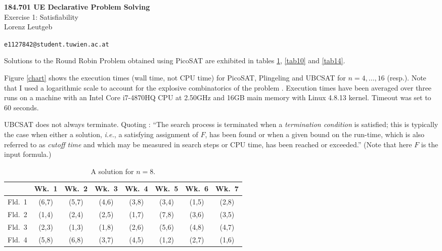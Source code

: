 \documentclass[a4paper]{article}
\begin{document}
\begin{center}
	\textbf{\Large{184.701 UE Declarative Problem Solving}}\\[3mm]
	
	\large{Exercise 1: Satisfiability}\\[7mm]

	Lorenz Leutgeb
	
	\texttt{e1127842@student.tuwien.ac.at}
\end{center}

Solutions to the Round Robin Problem \cite{DBLP:conf/aaai/BejarM00} obtained using PicoSAT are exhibited in tables \ref{tab8}, \ref{tab10} and \ref{tab14}.

Figure \ref{chart} shows the execution times (wall time, not CPU time) for PicoSAT, Plingeling and UBCSAT for $n = 4, \ldots, 16$ (resp.). Note that I used a logarithmic scale to account for the explosive combinatorics of the problem \cite{Mcaloon97sportsleague}. Execution times have been averaged over three runs on a machine with an Intel{\textregistered } Core{\texttrademark} i7-4870HQ CPU at 2.50GHz and 16GB main memory with Linux 4.8.13 kernel. Timeout was set to 60 seconds.

UBCSAT does not always terminate. Quoting \cite{DBLP:conf/sat/TompkinsH04}: \enquote{The search process is terminated when a \emph{termination condition} is satisfied; this is typically the case when either a solution, \emph{i.e.}, a satisfying assignment of $F$, has been found or when a given bound on the run-time, which is also referred to as \emph{cutoff time} and which may be measured in search steps or CPU time, has been reached or exceeded.} (Note that here $F$ is the input formula.)

\begin{table}[H]
\begin{center}
\begin{tabular}{|l||c|c|c|c|c|c|c|}
\hline
&Wk.~1&Wk.~2&Wk.~3&Wk.~4&Wk.~5&Wk.~6&Wk.~7\\
\hline\hline
Fld.~1&(6,7)&(5,7)&(4,6)&(3,8)&(3,4)&(1,5)&(2,8)\\\hline
Fld.~2&(1,4)&(2,4)&(2,5)&(1,7)&(7,8)&(3,6)&(3,5)\\\hline
Fld.~3&(2,3)&(1,3)&(1,8)&(2,6)&(5,6)&(4,8)&(4,7)\\\hline
Fld.~4&(5,8)&(6,8)&(3,7)&(4,5)&(1,2)&(2,7)&(1,6)\\\hline
\end{tabular}
\end{center}
\caption{A solution for $n=8$.}
\label{tab8}
\end{table}
\end{document}
